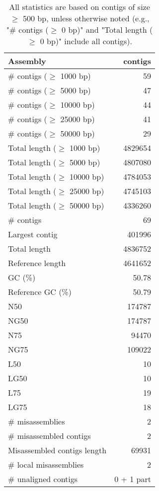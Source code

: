 \documentclass[12pt,a4paper]{article}
\begin{document}
\begin{table}[ht]
\begin{center}
\caption{All statistics are based on contigs of size $\geq$ 500 bp, unless otherwise noted (e.g., "\# contigs ($\geq$ 0 bp)" and "Total length ($\geq$ 0 bp)" include all contigs).}
\begin{tabular}{|l*{1}{|r}|}
\hline
Assembly & contigs \\ \hline
\# contigs ($\geq$ 1000 bp) & 59 \\ \hline
\# contigs ($\geq$ 5000 bp) & 47 \\ \hline
\# contigs ($\geq$ 10000 bp) & 44 \\ \hline
\# contigs ($\geq$ 25000 bp) & 41 \\ \hline
\# contigs ($\geq$ 50000 bp) & 29 \\ \hline
Total length ($\geq$ 1000 bp) & 4829654 \\ \hline
Total length ($\geq$ 5000 bp) & 4807080 \\ \hline
Total length ($\geq$ 10000 bp) & 4784053 \\ \hline
Total length ($\geq$ 25000 bp) & 4745103 \\ \hline
Total length ($\geq$ 50000 bp) & 4336260 \\ \hline
\# contigs & 69 \\ \hline
Largest contig & 401996 \\ \hline
Total length & 4836752 \\ \hline
Reference length & 4641652 \\ \hline
GC (\%) & 50.78 \\ \hline
Reference GC (\%) & 50.79 \\ \hline
N50 & 174787 \\ \hline
NG50 & 174787 \\ \hline
N75 & 94470 \\ \hline
NG75 & 109022 \\ \hline
L50 & 10 \\ \hline
LG50 & 10 \\ \hline
L75 & 19 \\ \hline
LG75 & 18 \\ \hline
\# misassemblies & 2 \\ \hline
\# misassembled contigs & 2 \\ \hline
Misassembled contigs length & 69931 \\ \hline
\# local misassemblies & 2 \\ \hline
\# unaligned contigs & 0 + 1 part \\ \hline

\end{tabular}
\end{center}
\end{table}
\end{document}
